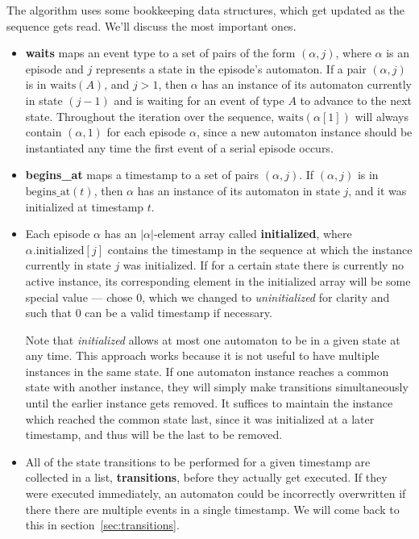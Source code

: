 The algorithm uses some bookkeeping data structures, which get updated as the sequence gets read. We'll discuss the most important ones.
\begin{itemize}
\item \textbf{waits} maps an event type to a set of pairs of the form $ (\alpha, j) $, where $ \alpha $ is an episode and $ j $ represents a state in the episode's automaton. If a pair $ (\alpha, j) $ is in $ \text{waits}(A) $, and $ j > 1 $, then $ \alpha $ has an instance of its automaton currently in state $ (j - 1) $ and is waiting for an event of type $ A $ to advance to the next state. Throughout the iteration over the sequence, $ \text{waits}(\alpha[1]) $ will always contain $ (\alpha, 1) $ for each episode $ \alpha $, since a new automaton instance should be instantiated any time the first event of a serial episode occurs.
\item \textbf{begins\_at} maps a timestamp to a set of pairs $ (\alpha, j) $. If $ (\alpha, j) $ is in $ \text{begins\_at}(t) $, then $ \alpha $ has an instance of its automaton in state $ j $, and it was initialized at timestamp $ t $.
\item Each episode $ \alpha $ has an $ | \alpha | $-element array called \textbf{initialized}, where $ \alpha \text{.initialized}[j] $ contains the timestamp in the sequence at which the instance currently in state $ j $ was initialized. If for a certain state there is currently no active instance, its corresponding element in the initialized array will be some special value --- \cite{mannila1997discovery} chose 0, which we changed to \emph{uninitialized} for clarity and such that 0 can be a valid timestamp if necessary.

Note that \emph{initialized} allows at most one automaton to be in a given state at any time. This approach works because it is not useful to have multiple instances in the same state. If one automaton instance reaches a common state with another instance, they will simply make transitions simultaneously until the earlier instance gets removed. It suffices to maintain the instance which reached the common state last, since it was initialized at a later timestamp, and thus will be the last to be removed.
\item All of the state transitions to be performed for a given timestamp are collected in a list, \textbf{transitions}, before they actually get executed. If they were executed immediately, an automaton could be incorrectly overwritten if there there are multiple events in a single timestamp. We will come back to this in section~\ref{sec:transitions}.
\end{itemize}

